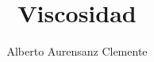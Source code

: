 \documentclass[twoside,twocolumn,spanish]{article}
\begin{document}
    \title{Viscosidad}
    \author{Alberto Aurensanz Clemente}
    \maketitle

    
    
    
    
    
    
\end{document}
